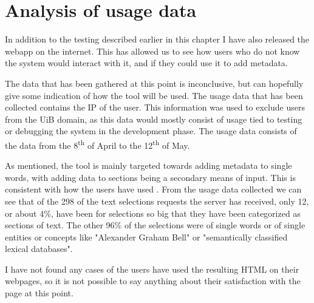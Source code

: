 \section{Analysis of usage data}
In addition to the testing described earlier in this chapter I have also released the webapp on the internet.
This has allowed us to see how users who do not know the system would interact with it,
and if they could use it to add metadata.

The data that has been gathered at this point is inconclusive, but can hopefully give some indication of how the tool will be used.
The usage data that has been collected contains the IP of the user.
This information was used to exclude users from the UiB domain,
as this data would mostly consist of usage tied to testing or debugging the system in the development phase.
The usage data consists of the data from the 8\textsuperscript{th}	 of April to the 12\textsuperscript{th} of May.

As mentioned, the tool is mainly targeted towards adding metadata to single words, with adding data to sections being
a secondary means of input.
This is consistent with how the users have used \theartefact.
From the usage data collected we can see that of the 298 of the text selections requests the server has received,
only 12, or about 4\%, have been for selections so big that they have been categorized as sections of text.
The other 96\% of the selections were of single words or of single entities or concepts like "Alexander Graham Bell" or
"semantically classified lexical databases".

I have not found any cases of the users have used the resulting HTML on their webpages,
so it is not possible to say anything about their satisfaction with the page at this point.

